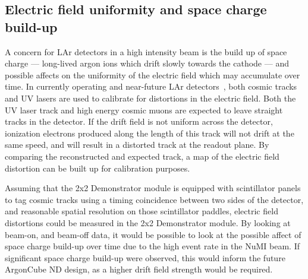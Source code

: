 \FloatBarrier


\subsection{Electric field uniformity and space charge build-up}
A concern for LAr detectors in a high intensity beam is the build up of space charge --- long-lived argon ions which drift slowly towards the cathode --- and possible affects on the uniformity of the electric field which may accumulate over time. In currently operating and near-future LAr detectors~\cite{Ereditato:2014lra, Antonello:2015lea}, both cosmic tracks and UV lasers are used to calibrate for distortions in the electric field. Both the UV laser track and high energy cosmic muons are expected to leave straight tracks in the detector. If the drift field is not uniform across the detector, ionization electrons produced along the length of this track will not drift at the same speed, and will result in a distorted track at the readout plane. By comparing the reconstructed and expected track, a map of the electric field distortion can be built up for calibration purposes.

Assuming that the 2x2 Demonstrator module is equipped with scintillator panels to tag cosmic tracks using a timing coincidence between two sides of the detector, and reasonable spatial resolution on those scintillator paddles, electric field distortions could be measured in the 2x2 Demonstrator module. By looking at beam-on, and beam-off data, it would be possible to look at the possible affect of space charge build-up over time due to the high event rate in the NuMI beam. If significant space charge build-up were observed, this would inform the future ArgonCube ND design, as a higher drift field strength would be required.

